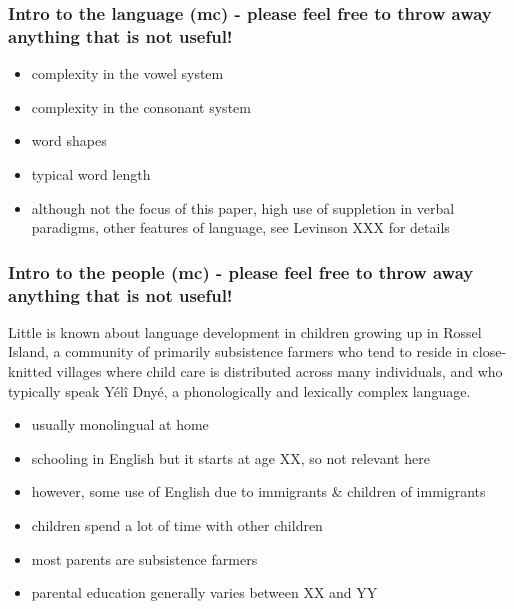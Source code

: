 \documentclass[english,,man,floatsintext]{apa6}
\providecommand{\tightlist}{%
  \setlength{\itemsep}{0pt}\setlength{\parskip}{0pt}}
\begin{document}
\hypertarget{intro-to-the-language-mc---please-feel-free-to-throw-away-anything-that-is-not-useful}{%
\subsubsection{\texorpdfstring{Intro to the language (\textbf{mc}) - please feel free to throw away anything that is not useful!}{Intro to the language (mc) - please feel free to throw away anything that is not useful!}}\label{intro-to-the-language-mc---please-feel-free-to-throw-away-anything-that-is-not-useful}}

\begin{itemize}
\tightlist
\item
  complexity in the vowel system
\item
  complexity in the consonant system
\item
  word shapes
\item
  typical word length
\item
  although not the focus of this paper, high use of suppletion in verbal paradigms, other features of language, see Levinson XXX for details
\end{itemize}

\hypertarget{intro-to-the-people-mc---please-feel-free-to-throw-away-anything-that-is-not-useful}{%
\subsubsection{\texorpdfstring{Intro to the people (\textbf{mc}) - please feel free to throw away anything that is not useful!}{Intro to the people (mc) - please feel free to throw away anything that is not useful!}}\label{intro-to-the-people-mc---please-feel-free-to-throw-away-anything-that-is-not-useful}}

Little is known about language development in children growing up in Rossel Island, a community of primarily subsistence farmers who tend to reside in close-knitted villages where child care is distributed across many individuals, and who typically speak Yélî Dnyé, a phonologically and lexically complex language.

\begin{itemize}
\tightlist
\item
  usually monolingual at home
\item
  schooling in English but it starts at age XX, so not relevant here
\item
  however, some use of English due to immigrants \& children of immigrants
\item
  children spend a lot of time with other children
\item
  most parents are subsistence farmers
\item
  parental education generally varies between XX and YY
\end{itemize}
\end{document}
